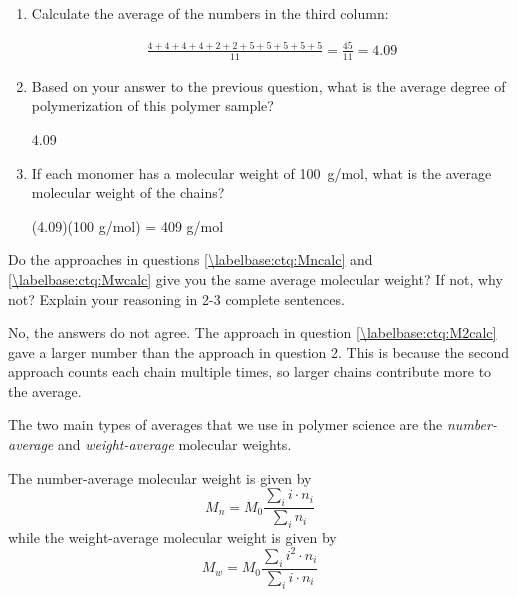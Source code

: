 \begin{activity}
\begin{ctqs}
\begin{enumerate}
			\item Calculate the average of the numbers in the third column:
			
				\begin{solution}[1.5in]
				
					\begin{align*}
						\frac{4+4+4+4+2+2+5+5+5+5+5}{11} = \frac{45}{11} = 4.09
					\end{align*}
				
				\end{solution}
			
			\item Based on your answer to the previous question, what is the average degree of polymerization of this polymer sample?
			
				\begin{solution}[0.75in]
					4.09
				\end{solution}
				
			\item If each monomer has a molecular weight of 100~g/mol, what is the average molecular weight of the chains?
			
				\begin{solution}[0.75in]
					(4.09)(100 g/mol) = 409 g/mol
				\end{solution}
				
		\end{enumerate}
		
	\question Do the approaches in questions \ref{\labelbase:ctq:Mncalc} and \ref{\labelbase:ctq:Mwcalc} give you the same average molecular weight?  If not, why not?  Explain your reasoning in 2-3 complete sentences.
	
		\begin{solution}[3in]
			No, the answers do not agree.  The approach in question \ref{\labelbase:ctq:M2calc} gave a larger number than the approach in question 2. %
			This is because the second approach counts each chain multiple times, so larger chains contribute more to the average.
		\end{solution}
		
\end{ctqs}

\begin{infobox}
	
	The two main types of averages that we use in polymer science are the \emph{number-average} and \emph{weight-average} molecular weights.
	
	The number-average molecular weight is given by
	\begin{equation*}
		M_n = M_0 \frac{\sum_i i \cdot n_i}{\sum_i n_i}
	\end{equation*}
	while the weight-average molecular weight is given by
	\begin{equation*}
		M_w = M_0 \frac{\sum_i i^2 \cdot n_i}{\sum_i i\cdot n_i}
	\end{equation*}
	

\end{infobox}
\end{activity}
